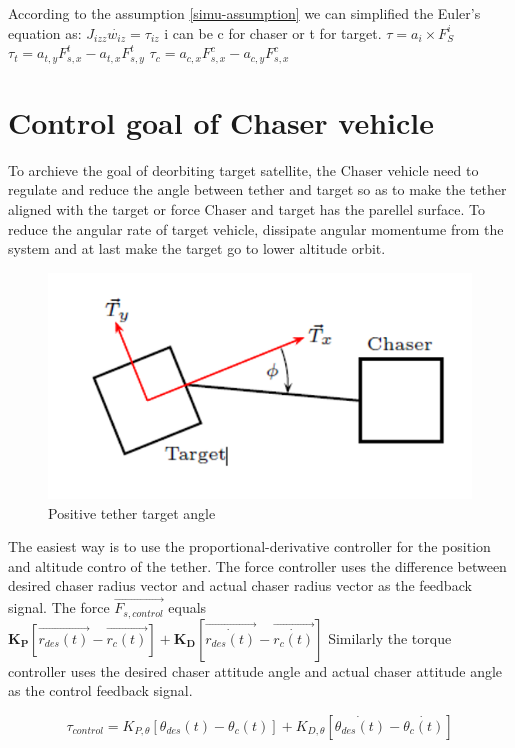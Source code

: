 According to the assumption \ref{simu-assumption} we can simplified the Euler's equation as: $J_{izz}\dot{w_{iz}}=\tau_{iz}$	i can be c for chaser or t for target.
$\tau=a_i\times F^i_S$	$\tau_t = a_{t,y}F_{s,x}^t - a_{t,x}F_{s,y}^t$	$\tau_c = a_{c,x}F_{s,x}^c - a_{c,y}F_{s,x}^c$

\section{Control goal of Chaser vehicle}
To archieve the goal of deorbiting target satellite, the Chaser vehicle need to regulate and reduce the angle between tether and target so as to make the tether aligned with the target or force Chaser and target has the parellel surface. To reduce the angular rate of target vehicle, dissipate angular momentume from the system and at last make the target go to lower altitude orbit.
\begin{figure}
\centering
\includegraphics{fig/simulation/TetherTargetAngle}
\caption{Positive tether target angle}
\end{figure}
The easiest way is to use the proportional-derivative controller for the position and altitude contro of the tether.
The force controller uses the difference between desired chaser radius vector and actual chaser radius vector as the feedback signal. The force $\overrightarrow{F_{s,control}}$ equals $\mathbf{K_P}\left[\overrightarrow{r_{des}(t)}-\overrightarrow{r_c(t)}\right]+\mathbf{K_D}\left[\overrightarrow{\dot{r_{des}(t)}}-\overrightarrow{\dot{r_c(t)}}\right]$
Similarly the torque controller uses the desired chaser attitude angle and actual chaser attitude angle as the control feedback signal.

$$\tau_{control} =K_{P,\theta}\left[\theta_{des}(t)-\theta_c(t)\right] + K_{D,\theta}\left[\dot{\theta_{des}(t)}-\dot{\theta_c(t)}\right]$$

